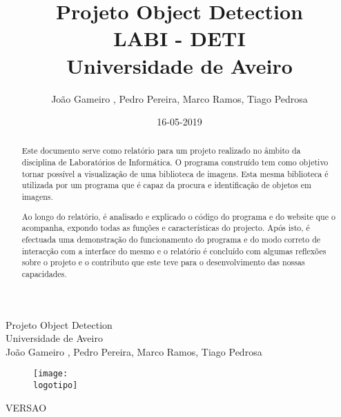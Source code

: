 \documentclass{report}
\begin{document}
%
\def\titulo{Projeto Object Detection}
\def\data{16-05-2019}
\def\autores{João Gameiro , Pedro Pereira, Marco Ramos, Tiago Pedrosa}
\def\autorescontactos{(93097) joao.gameiro@ua.pt, (93196) pedrocjdpereira@ua.pt, (93388) msramos99@ua.pt, (93389) pedrosa.tiago@ua.pt}
\def\versao{VERSAO}
\def\departamento{LABI - DETI}
\def\empresa{Universidade de Aveiro}
\def\logotipo{ua.pdf}
%
%
\begin{titlepage}

\begin{center}
%
\vspace*{50mm}
%
{\Huge \titulo}\\ 
%
\vspace{10mm}
%
{\Large \empresa}\\
%
\vspace{10mm}
%
{\LARGE \autores}\\ 
%
\vspace{30mm}
%
\begin{figure}[h]
\center
\texttt{[image: \\logotipo]}
\end{figure}
%
\vspace{30mm}
\end{center}
%
\begin{flushright}
\versao
\end{flushright}
\end{titlepage}

\title{%
{\Huge\textbf{\titulo}}\\
{\Large \departamento\\ \empresa}
}
%
\author{%
    \autores{}
}
%
\date{\data}
%
\maketitle{}



\begin{abstract}
Este documento serve como relatório para um projeto realizado no âmbito da disciplina de Laboratórios de Informática. O programa construído tem como objetivo tornar possível a visualização de uma biblioteca de imagens. Esta mesma biblioteca é utilizada por um programa que é capaz da procura e identificação de objetos em imagens.

Ao longo do relatório, é analisado e explicado o código do programa e do website que o acompanha, expondo todas as funções e características do projecto. Após isto, é efectuada uma demonstração do funcionamento do programa e do modo correto de interacção com a interface do mesmo e o relatório é concluído com algumas reflexões sobre o projeto e o contributo
que este teve para o desenvolvimento das nossas capacidades.


\end{abstract}
\end{document}
